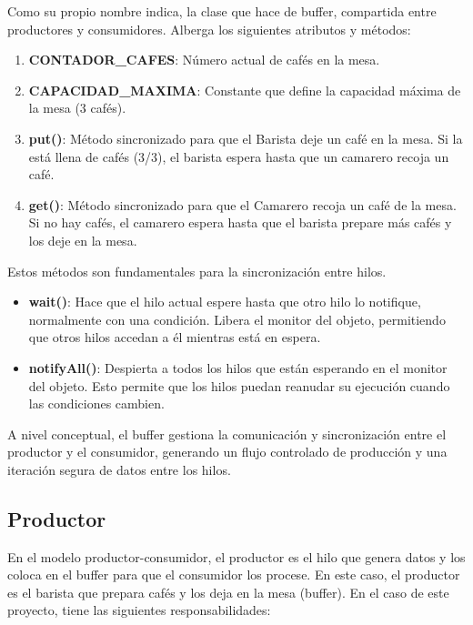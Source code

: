 \documentclass[14pt]{extarticle}
\begin{document}
        Como su propio nombre indica, la clase que hace de buffer, compartida entre productores y consumidores. Alberga los siguientes atributos y métodos:
        \begin{enumerate}
            \item \textbf{CONTADOR\_CAFES}: Número actual de cafés en la mesa.
            \item \textbf{CAPACIDAD\_MAXIMA}: Constante que define la capacidad máxima de la mesa (3 cafés).
            \item \textbf{put()}: Método sincronizado para que el Barista deje un café en la mesa. Si la está llena de cafés (3/3), el barista espera hasta que un camarero recoja un café.
            \item \textbf{get()}: Método sincronizado para que el Camarero recoja un café de la mesa. Si no hay cafés, el camarero espera hasta que el barista prepare más cafés y los deje en la mesa.
        \end{enumerate}

        \vspace{0.3cm}

            Estos métodos son fundamentales para la sincronización entre hilos.
            \begin{itemize}
                \item \textbf{wait()}: Hace que el hilo actual espere hasta que otro hilo lo notifique, normalmente con una condición. Libera el monitor del objeto, permitiendo que otros hilos accedan a él mientras está en espera.
                \item \textbf{notifyAll()}: Despierta a todos los hilos que están esperando en el monitor del objeto. Esto permite que los hilos puedan reanudar su ejecución cuando las condiciones cambien.
            \end{itemize}


        \vspace{0.3cm}
        A nivel conceptual, el buffer gestiona la comunicación y sincronización entre el productor y el consumidor, generando un flujo controlado de producción y una iteración segura de datos entre los hilos.

    \newpage
    \subsection{Productor}

        En el modelo productor-consumidor, el productor es el hilo que genera datos y los coloca en el buffer para que el consumidor los procese. En este caso, el productor es el barista que prepara cafés y los deja en la mesa (buffer). En el caso de este proyecto, tiene las siguientes responsabilidades:
\end{document}
